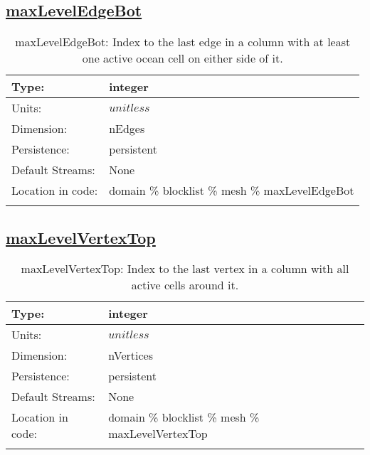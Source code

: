 \subsection[maxLevelEdgeBot]{\hyperref[sec:var_tab_mesh]{maxLevelEdgeBot}}
\label{subsec:var_sec_mesh_maxLevelEdgeBot}
\begin{center}
\begin{longtable}{| p{2.0in} | p{4.0in} |}
        \hline 
        Type: & integer \\
        \hline 
        Units: & $unitless$ \\
        \hline 
        Dimension: & nEdges \\
        \hline 
        Persistence: & persistent \\
        \hline 
		 Default Streams: & None \\
        \hline 
		 Location in code: & domain \% blocklist \% mesh \% maxLevelEdgeBot \\
		 \hline 
    \caption{maxLevelEdgeBot: Index to the last edge in a column with at least one active ocean cell on either side of it.}
\end{longtable}
\end{center}
\subsection[maxLevelVertexTop]{\hyperref[sec:var_tab_mesh]{maxLevelVertexTop}}
\label{subsec:var_sec_mesh_maxLevelVertexTop}
\begin{center}
\begin{longtable}{| p{2.0in} | p{4.0in} |}
        \hline 
        Type: & integer \\
        \hline 
        Units: & $unitless$ \\
        \hline 
        Dimension: & nVertices \\
        \hline 
        Persistence: & persistent \\
        \hline 
		 Default Streams: & None \\
        \hline 
		 Location in code: & domain \% blocklist \% mesh \% maxLevelVertexTop \\
		 \hline 
    \caption{maxLevelVertexTop: Index to the last vertex in a column with all active cells around it.}
\end{longtable}
\end{center}
